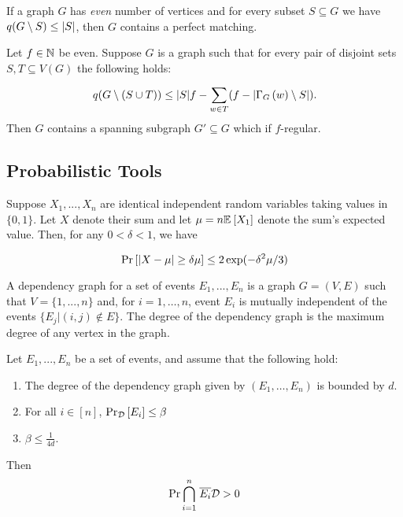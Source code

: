 \documentclass[11pt]{article}
\begin{document}
\begin{lemma}\label{lemma:tutte-criterion}
If a graph $G$ has  \emph{even} number of vertices and for every subset $S \subseteq G$ we have $q(G \setminus S) \leq |S|$, then $G$ contains a perfect matching.
\end{lemma}

\begin{lemma}\label{lemma:tutte-criterion-factor}
  Let $f \in \mathbb{N}$ be even. Suppose $G$ is a graph such that for every pair of disjoint sets $S, T \subseteq V(G)$ the following holds:

  \[ q(G \setminus (S \cup T)) \le |S|f - \sum_{w \in T} (f - |\Gamma_{G}\left(w\right) \setminus S|). \]
  Then $G$ contains a spanning subgraph $G' \subseteq G$ which if $f$-regular.
\end{lemma}


\newpage

\subsection{Probabilistic Tools}

\begin{lemma}\label{lemma:mult-chernoff}
Suppose $X_1, ..., X_n$ are identical independent random variables taking values in $\{0, 1\}$. Let $X$ denote their sum and let $\mu = n\mathbb{E}_{}\left[X_1\right]$ denote the sum's expected value. Then, for any $0 < \delta < 1$, we have

\[ \Pr\left[|X - \mu| \geq \delta \mu \right] \leq 2\exp(-\delta^2\mu/3)\]

\end{lemma}


A dependency graph for a set of events $E_1, . . . , E_n$ is a graph $G=(V, E)$ such that $V = \{1,.. . , n\}$ and,  for $i= 1,\dots, n$, event $E_i$ is mutually independent
of the events $\{E_j | (i, j) \notin E\}$. The degree of the dependency graph is the maximum degree of any vertex in the graph.


\begin{lemma}\label{lemma:lll}
Let $E_1,...,E_n$ be a set of events, and assume that the following hold:
\begin{enumerate}
\item The degree of the dependency graph given by $(E_1, \dots, E_n)$ is bounded by $d$.

\item For all $i \in [n]$, $\Pr_{\mathcal{D}}\left[E_i \right] \leq \beta$

\item $\beta \leq \frac{1}{4d}$.
\end{enumerate}
Then
\[ \Pr{\overset{n}{ \underset{i=1}{\bigcap}} \hspace{0.1cm}  \overline{E_i}}{\mathcal{D}} > 0\]


\end{lemma}
\end{document}
